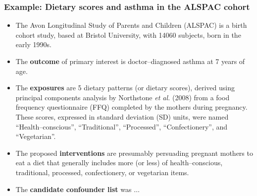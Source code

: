 \documentclass[11pt]{beamer}
\begin{document}
\begin{frame}
\frametitle{Example: Dietary scores and asthma in the ALSPAC cohort}

\begin{itemize}

\item<2-> The Avon Longitudinal Study of Parents and Children (ALSPAC) is a birth cohort study,
based at Bristol University, with 14060 subjects, born in the early 1990s.

\item<3-> The \textbf{outcome} of primary interest is doctor--diagnosed asthma at 7 years of age.

\item<4-> The \textbf{exposures} are 5 dietary patterns (or dietary scores),
derived using principal components analysis by Northstone \textit{et al.} (2008)\cite{northstone2008}
from a food frequency questionnaire (FFQ) completed by the mothers during pregnancy.
These scores, expressed in standard deviation (SD) units, were named
``Health--conscious'', ``Traditional'', ``Processed'', ``Confectionery'', and ``Vegetarian''.

\item<5-> The proposed \textbf{interventions} are presumably persuading pregnant mothers to eat a diet
that generally includes more (or less) of health--conscious, traditional, processed, confectionery,
or vegetarian items.

\item<6-> The \textbf{candidate confounder list} was $\ldots$

\end{itemize}

\end{frame}
\end{document}
